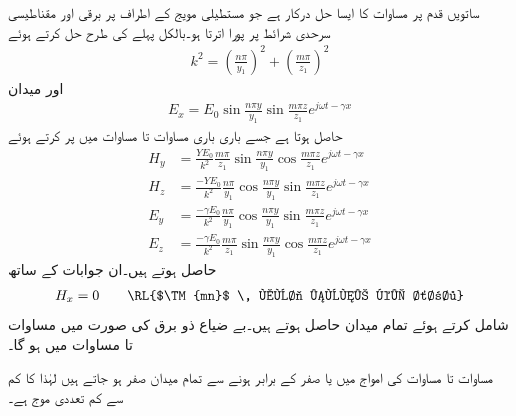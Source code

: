ساتویں قدم پر مساوات  کا ایسا حل درکار ہے جو مستطیلی مویج کے اطراف پر برقی اور مقناطیسی سرحدی شرائط پر پورا اترتا ہو۔بالکل پہلے کی طرح حل کرتے ہوئے
\begin{align}\label{مساوات_مویج_عرضی_مقناطیسی_مستقل_قے_ب}
k^2=\left(\frac{n \pi}{y_1}\right)^2+\left(\frac{m \pi}{z_1}\right)^2
\end{align}
اور میدان
\begin{align}\label{مساوات_مویج_عرضی_مقناطیسی_حل_الف}
E_x=E_0 \sin \frac{n \pi y}{y_1} \sin \frac{m \pi z}{z_1} e^{j \omega t -\gamma x}
\end{align}
حاصل ہوتا ہے جسے باری باری مساوات  تا مساوات  میں پر کرتے ہوئے
\begin{align}
H_y&=\frac{Y E_0}{k^2} \frac{m \pi}{z_1}\sin \frac{n \pi y}{y_1} \cos \frac{m \pi z}{z_1} e^{j \omega t -\gamma x} \label{مساوات_مویج_عرضی_مقناطیسی_حل_ب}\\
H_z&=\frac{-Y E_0}{k^2} \frac{n\pi}{y_1}\cos \frac{n \pi y}{y_1} \sin \frac{m \pi z}{z_1} e^{j \omega t -\gamma x} \label{مساوات_مویج_عرضی_مقناطیسی_حل_پ}\\
E_y&=\frac{-\gamma E_0}{k^2}\frac{n\pi}{y_1}\cos \frac{n \pi y}{y_1} \sin \frac{m \pi z}{z_1} e^{j \omega t -\gamma x} \label{مساوات_مویج_عرضی_مقناطیسی_حل_ت}\\
E_z&=\frac{-\gamma E_0}{k^2} \frac{m \pi}{z_1}\sin \frac{n \pi y}{y_1} \cos \frac{m \pi z}{z_1} e^{j \omega t -\gamma x}\label{مساوات_مویج_عرضی_مقناطیسی_حل_ٹ}
\end{align}
حاصل ہوتے ہیں۔ان جوابات کے ساتھ
\begin{align}\label{مساوات_مویج_عرضی_مقناطیسی_حل_ث}
H_x=0  \quad \quad \text{\RL{$\TM{mn}$ \, موج ہونے کی شرط}} 
\end{align}
شامل کرتے ہوئے تمام میدان حاصل ہوتے ہیں۔بے ضیاع ذو برق  کی صورت میں مساوات  تا مساوات  میں  ہو  گا۔

مساوات  تا مساوات  کی  امواج  میں  یا  صفر کے برابر ہونے سے تمام میدان صفر ہو جاتے ہیں لہٰذا  کا کم سے کم تعددی موج  ہے۔

